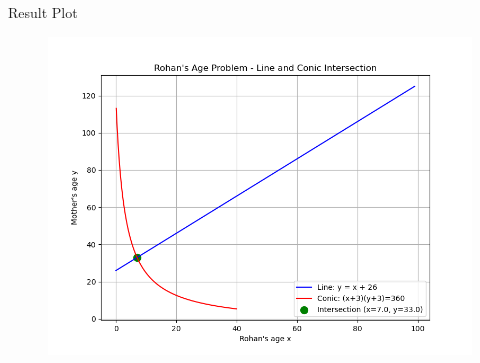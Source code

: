 \documentclass{beamer}
\numberwithin{equation}{section}
\theoremstyle{remark}
\begin{document}
\begin{frame}{Result Plot}
 \begin{figure}[H]
     \centering
     \includegraphics[width=0.8\columnwidth]{Figs/Fig1.png}
     \caption*{}
     \label{fig:fig1}
 \end{figure}
 
\end{frame}
\end{document}
